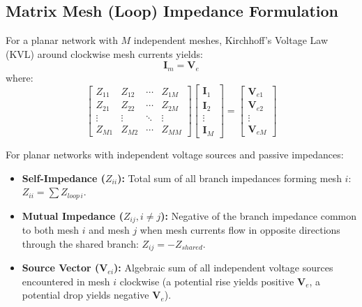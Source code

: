 \documentclass[12pt,a4paper]{article}
\begin{document}
\subsection{Matrix Mesh (Loop) Impedance Formulation}
For a planar network with $M$ independent meshes, Kirchhoff's Voltage Law (KVL) around clockwise mesh currents yields:
\begin{equation}
  [\mathbf{Z}] \mathbf{I}_m = \mathbf{V}_e
\end{equation}
where:
\begin{equation}
  \begin{bmatrix}
    Z_{11} & Z_{12} & \cdots & Z_{1M} \\
    Z_{21} & Z_{22} & \cdots & Z_{2M} \\
    \vdots & \vdots & \ddots & \vdots \\
    Z_{M1} & Z_{M2} & \cdots & Z_{MM}
  \end{bmatrix}
  \begin{bmatrix}
    \mathbf{I}_1 \\ \mathbf{I}_2 \\ \vdots \\ \mathbf{I}_M
  \end{bmatrix}
  =
  \begin{bmatrix}
    \mathbf{V}_{e1} \\ \mathbf{V}_{e2} \\ \vdots \\ \mathbf{V}_{eM}
  \end{bmatrix}
\end{equation}

\begin{tcolorbox}[formulabox, title={\textbf{Inspection Rules for Mesh Impedance Matrix $[\mathbf{Z}]$}}]
For planar networks with independent voltage sources and passive impedances:
\begin{itemize}[leftmargin=*, itemsep=2pt]
  \item \textbf{Self-Impedance ($Z_{ii}$):} Total sum of all branch impedances forming mesh $i$: $Z_{ii} = \sum Z_{loop\,i}$.
  \item \textbf{Mutual Impedance ($Z_{ij}, i \ne j$):} Negative of the branch impedance common to both mesh $i$ and mesh $j$ when mesh currents flow in opposite directions through the shared branch: $Z_{ij} = -Z_{shared}$.
  \item \textbf{Source Vector ($\mathbf{V}_{ei}$):} Algebraic sum of all independent voltage sources encountered in mesh $i$ clockwise (a potential rise yields positive $\mathbf{V}_e$, a potential drop yields negative $\mathbf{V}_e$).
\end{itemize}
\end{tcolorbox}
\end{document}
